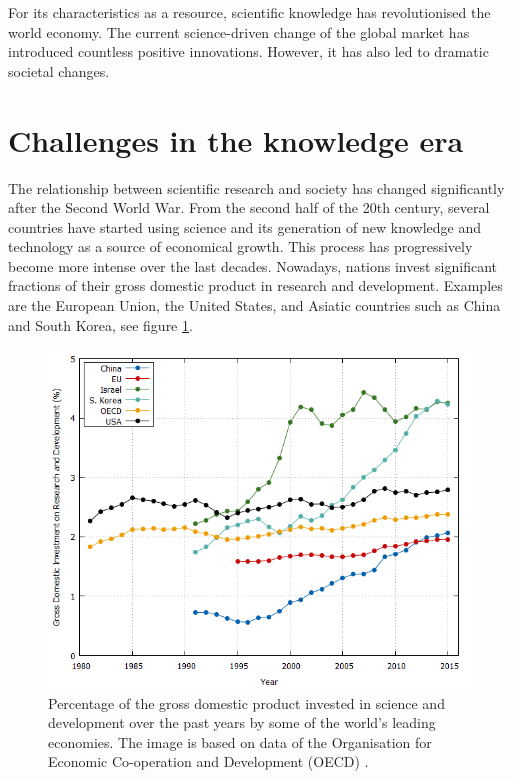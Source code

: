 For its characteristics as a resource, scientific knowledge has revolutionised the world economy. The current science-driven change of the global market has introduced countless positive innovations. However, it has also led to dramatic societal changes.   

\section{Challenges in the knowledge era} \label{Challenges_in_the_knowledge_era}
The relationship between scientific research and society has changed significantly after the Second World War. From the second half of the 20th century, several countries have started using science and its generation of new knowledge and technology as a source of economical growth. This process has progressively become more intense over the last decades. Nowadays, nations invest significant fractions of their gross domestic product in research and development. Examples are the European Union, the United States, and Asiatic countries such as China and South Korea, see figure \ref{GD_investment}.    

\begin{figure}[!t] 
 \begin{center}
 \includegraphics[scale=0.3]{Images/GD_investment.png}
 \caption{Percentage of the gross domestic product invested in science and development over the past years by some of the world's leading economies. The image is based on data of the Organisation for Economic Co-operation and Development (OECD) \cite{OECD}.}
 \label{GD_investment}
 \end{center}
\end{figure}

